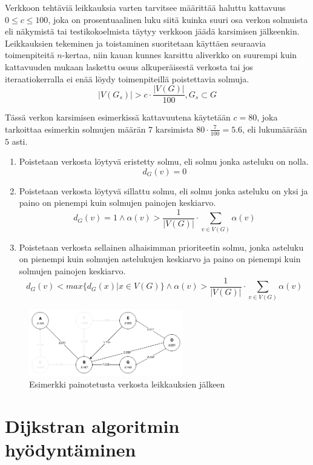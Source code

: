   Verkkoon tehtäviä leikkauksia varten tarvitsee määrittää haluttu kattavuus \(0 \leq c \leq 100\), joka on prosentuaalinen luku siitä kuinka suuri osa verkon solmuista eli näkymistä tai testikokoelmista täytyy verkkoon jäädä karsimisen jälkeenkin. Leikkauksien tekeminen ja toistaminen suoritetaan käyttäen seuraavia toimenpiteitä \(n\)-kertaa, niin kauan kunnes karsittu aliverkko on suurempi kuin kattavuuden mukaan laskettu osuus alkuperäisestä verkosta tai jos iteraatiokerralla ei enää löydy toimenpiteillä poistettavia solmuja.
  \[|V(G_s)| > c \cdot \frac{|V(G)|}{100}, G_s \subset G\]

  Tässä verkon karsimisen esimerkissä kattavuutena käytetään \(c = 80\), joka tarkoittaa esimerkin solmujen määrän \(7\) karsimista \(80 \cdot \frac{7}{100} = 5.6\), eli lukumäärään \(5\) asti.

  \begin{enumerate}
    \item Poistetaan verkosta löytyvä eristetty solmu, eli solmu jonka asteluku on nolla.
    \[d_G(v) = 0\]
    \item Poistetaan verkosta löytyvä sillattu solmu, eli solmu jonka asteluku on yksi ja paino on pienempi kuin solmujen painojen keskiarvo.
    \[d_G(v) = 1  \land \alpha(v) > \frac{1}{|V(G)|} \cdot \sum\limits_{v \in V(G)} \alpha(v)\]
    \item Poistetaan verkosta sellainen alhaisimman prioriteetin solmu, jonka asteluku on pienempi kuin solmujen astelukujen keskiarvo ja paino on pienempi kuin solmujen painojen keskiarvo.
    \[d_G(v) < max\{d_G(x) | x \in V(G)\} \land \alpha(v) > \frac{1}{|V(G)|} \cdot \sum\limits_{v \in V(G)} \alpha(v)\]
  \end{enumerate}

  \begin{figure}[H]
    \centering
    \includegraphics[width=0.6\textwidth]{assets/painotettu-verkko-jalkeen.png}
    \caption{Esimerkki painotetusta verkosta leikkauksien jälkeen}
    \label{fig:painotettu-verkko-jalkeen}
  \end{figure}

\section{Dijkstran algoritmin hyödyntäminen} \label{ch:10_dijkstran_algoritmin_hyodyntaminen}

